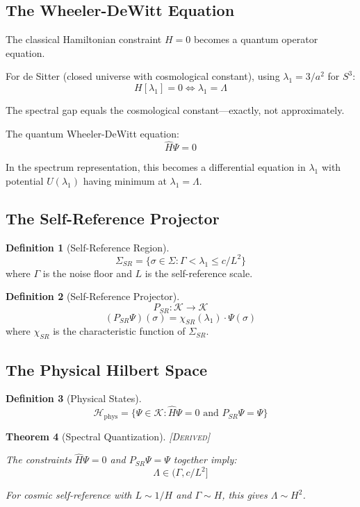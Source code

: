 \documentclass[11pt,a4paper]{article}
\newtheorem{theorem}{Theorem}[section]
\theoremstyle{definition}
\newtheorem{definition}[theorem]{Definition}
\theoremstyle{remark}
\begin{document}
\subsection{The Wheeler-DeWitt Equation}

The classical Hamiltonian constraint $H = 0$ becomes a quantum operator equation.

For de Sitter (closed universe with cosmological constant), using $\lambda_1 = 3/a^2$ for $S^3$:
\[
H[\lambda_1] = 0 \iff \lambda_1 = \Lambda
\]

The spectral gap equals the cosmological constant---exactly, not approximately.

The quantum Wheeler-DeWitt equation:
\[
\hat{H} \Psi = 0
\]

In the spectrum representation, this becomes a differential equation in $\lambda_1$ with potential $U(\lambda_1)$ having minimum at $\lambda_1 = \Lambda$.

\subsection{The Self-Reference Projector}

\begin{definition}[Self-Reference Region]
\[
\Sigma_{SR} = \{ \sigma \in \Sigma : \Gamma < \lambda_1 \leq c/L^2 \}
\]
where $\Gamma$ is the noise floor and $L$ is the self-reference scale.
\end{definition}

\begin{definition}[Self-Reference Projector]
\[
P_{SR}: \mathcal{K} \to \mathcal{K}
\]
\[
(P_{SR} \Psi)(\sigma) = \chi_{SR}(\lambda_1) \cdot \Psi(\sigma)
\]
where $\chi_{SR}$ is the characteristic function of $\Sigma_{SR}$.
\end{definition}

\subsection{The Physical Hilbert Space}

\begin{definition}[Physical States]
\[
\mathcal{H}_{\text{phys}} = \{ \Psi \in \mathcal{K} : \hat{H}\Psi = 0 \text{ and } P_{SR}\Psi = \Psi \}
\]
\end{definition}

\begin{theorem}[Spectral Quantization]
\textsc{[Derived]}

The constraints $\hat{H}\Psi = 0$ and $P_{SR}\Psi = \Psi$ together imply:
\[
\Lambda \in (\Gamma, c/L^2]
\]

For cosmic self-reference with $L \sim 1/H$ and $\Gamma \sim H$, this gives $\Lambda \sim H^2$.
\end{theorem}
\end{document}
